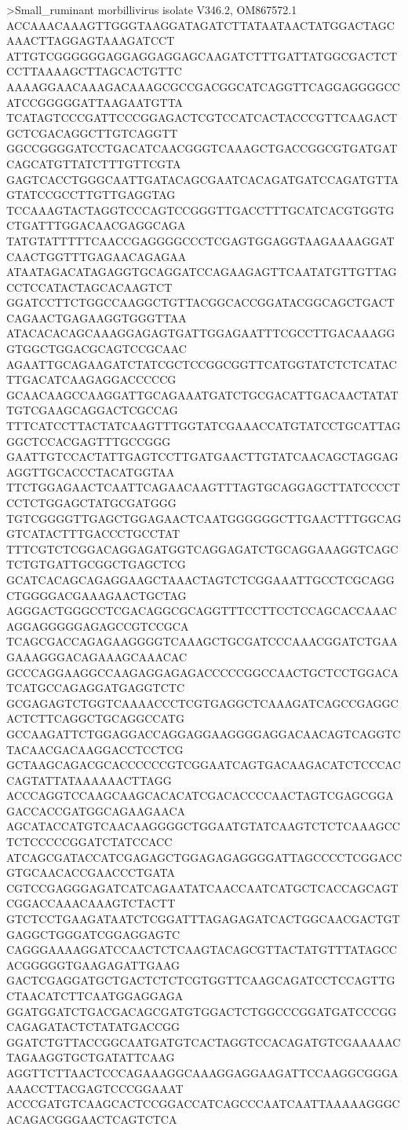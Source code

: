 >Small_ruminant morbillivirus isolate V346.2, OM867572.1
ACCAAACAAAGTTGGGTAAGGATAGATCTTATAATAACTATGGACTAGCAAACTTAGGAGTAAAGATCCT
ATTGTCGGGGGGAGGAGGAGGAGCAAGATCTTTGATTATGGCGACTCTCCTTAAAAGCTTAGCACTGTTC
AAAAGGAACAAAGACAAAGCGCCGACGGCATCAGGTTCAGGAGGGGCCATCCGGGGGATTAAGAATGTTA
TCATAGTCCCGATTCCCGGAGACTCGTCCATCACTACCCGTTCAAGACTGCTCGACAGGCTTGTCAGGTT
GGCCGGGGATCCTGACATCAACGGGTCAAAGCTGACCGGCGTGATGATCAGCATGTTATCTTTGTTCGTA
GAGTCACCTGGGCAATTGATACAGCGAATCACAGATGATCCAGATGTTAGTATCCGCCTTGTTGAGGTAG
TCCAAAGTACTAGGTCCCAGTCCGGGTTGACCTTTGCATCACGTGGTGCTGATTTGGACAACGAGGCAGA
TATGTATTTTTCAACCGAGGGGCCCTCGAGTGGAGGTAAGAAAAGGATCAACTGGTTTGAGAACAGAGAA
ATAATAGACATAGAGGTGCAGGATCCAGAAGAGTTCAATATGTTGTTAGCCTCCATACTAGCACAAGTCT
GGATCCTTCTGGCCAAGGCTGTTACGGCACCGGATACGGCAGCTGACTCAGAACTGAGAAGGTGGGTTAA
ATACACACAGCAAAGGAGAGTGATTGGAGAATTTCGCCTTGACAAAGGGTGGCTGGACGCAGTCCGCAAC
AGAATTGCAGAAGATCTATCGCTCCGGCGGTTCATGGTATCTCTCATACTTGACATCAAGAGGACCCCCG
GCAACAAGCCAAGGATTGCAGAAATGATCTGCGACATTGACAACTATATTGTCGAAGCAGGACTCGCCAG
TTTCATCCTTACTATCAAGTTTGGTATCGAAACCATGTATCCTGCATTAGGGCTCCACGAGTTTGCCGGG
GAATTGTCCACTATTGAGTCCTTGATGAACTTGTATCAACAGCTAGGAGAGGTTGCACCCTACATGGTAA
TTCTGGAGAACTCAATTCAGAACAAGTTTAGTGCAGGAGCTTATCCCCTCCTCTGGAGCTATGCGATGGG
TGTCGGGGTTGAGCTGGAGAACTCAATGGGGGGCTTGAACTTTGGCAGGTCATACTTTGACCCTGCCTAT
TTTCGTCTCGGACAGGAGATGGTCAGGAGATCTGCAGGAAAGGTCAGCTCTGTGATTGCGGCTGAGCTCG
GCATCACAGCAGAGGAAGCTAAACTAGTCTCGGAAATTGCCTCGCAGGCTGGGGACGAAAGAACTGCTAG
AGGGACTGGGCCTCGACAGGCGCAGGTTTCCTTCCTCCAGCACCAAACAGGAGGGGGAGAGCCGTCCGCA
TCAGCGACCAGAGAAGGGGTCAAAGCTGCGATCCCAAACGGATCTGAAGAAAGGGACAGAAAGCAAACAC
GCCCAGGAAGGCCAAGAGGAGAGACCCCCGGCCAACTGCTCCTGGACATCATGCCAGAGGATGAGGTCTC
GCGAGAGTCTGGTCAAAACCCTCGTGAGGCTCAAAGATCAGCCGAGGCACTCTTCAGGCTGCAGGCCATG
GCCAAGATTCTGGAGGACCAGGAGGAAGGGGAGGACAACAGTCAGGTCTACAACGACAAGGACCTCCTCG
GCTAAGCAGACGCACCCCCCGTCGGAATCAGTGACAAGACATCTCCCACCAGTATTATAAAAAACTTAGG
ACCCAGGTCCAAGCAAGCACACATCGACACCCCAACTAGTCGAGCGGAGACCACCGATGGCAGAAGAACA
AGCATACCATGTCAACAAGGGGCTGGAATGTATCAAGTCTCTCAAAGCCTCTCCCCCGGATCTATCCACC
ATCAGCGATACCATCGAGAGCTGGAGAGAGGGGATTAGCCCCTCGGACCGTGCAACACCGAACCCTGATA
CGTCCGAGGGAGATCATCAGAATATCAACCAATCATGCTCACCAGCAGTCGGACCAAACAAAGTCTACTT
GTCTCCTGAAGATAATCTCGGATTTAGAGAGATCACTGGCAACGACTGTGAGGCTGGGATCGGAGGAGTC
CAGGGAAAAGGATCCAACTCTCAAGTACAGCGTTACTATGTTTATAGCCACGGGGGTGAAGAGATTGAAG
GACTCGAGGATGCTGACTCTCTCGTGGTTCAAGCAGATCCTCCAGTTGCTAACATCTTCAATGGAGGAGA
GGATGGATCTGACGACAGCGATGTGGACTCTGGCCCGGATGATCCCGGCAGAGATACTCTATATGACCGG
GGATCTGTTACCGGCAATGATGTCACTAGGTCCACAGATGTCGAAAAACTAGAAGGTGCTGATATTCAAG
AGGTTCTTAACTCCCAGAAAGGCAAAGGAGGAAGATTCCAAGGCGGGAAAACCTTACGAGTCCCGGAAAT
ACCCGATGTCAAGCACTCCGGACCATCAGCCCAATCAATTAAAAAGGGCACAGACGGGAACTCAGTCTCA
